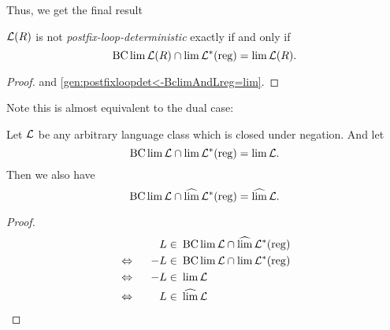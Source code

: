 Thus, we get the final result
\begin{theorem}
\label{gen:postfix-loop-det=limAndBclim}
$\mathcal{L}(R)$ is not \emph{postfix-loop-deterministic} exactly if and only if
\[ \operatorname{BC} \lim \mathcal{L}(R) \cap \lim \mathcal{L}^*(\textup{\textrm{reg}}) = \lim \mathcal{L}(R) . \]
\begin{proof}
 and \cref{gen:postfixloopdet<-BclimAndLreg=lim}.
\end{proof}
\end{theorem}

Note this is almost equivalent to the dual case:
\begin{lemma}
\label{gen:limAndBclim:dual}
Let $\mathcal{L}$ be any arbitrary language class which is closed under negation. And let
\[ \operatorname{BC} \lim \mathcal{L} \cap \lim \mathcal{L}^*(\textup{\textrm{reg}}) = \lim \mathcal{L} . \]
Then we also have
\[ \operatorname{BC} \lim \mathcal{L} \cap \operatorname{\widehat{lim}} \mathcal{L}^*(\textup{\textrm{reg}}) = \operatorname{\widehat{lim}} \mathcal{L} . \]
\begin{proof}
\begin{alignat*}{3}
&& L \in & \ \operatorname{BC} \lim \mathcal{L} \cap \operatorname{\widehat{lim}} \mathcal{L}^*(\textup{\textrm{reg}}) \\
&\Leftrightarrow \ \ & -L \in & \ \operatorname{BC} \lim \mathcal{L} \cap \lim \mathcal{L}^*(\textup{\textrm{reg}}) \\
&\Leftrightarrow \ \ & -L \in & \ \lim \mathcal{L} \\
&\Leftrightarrow \ \ & L \in & \ \operatorname{\widehat{lim}} \mathcal{L}
\end{alignat*}
\end{proof}
\end{lemma}

%
%

